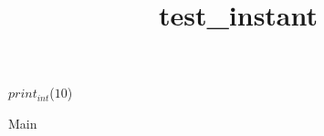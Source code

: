 \documentclass[8pt]{article}
\title{test\_instant}
\begin{document}
\maketitle


\begin{algorithm}[H]
$print_{int}$($ 10 $)\;
\caption{Main}
\end{algorithm}
\end{document}
